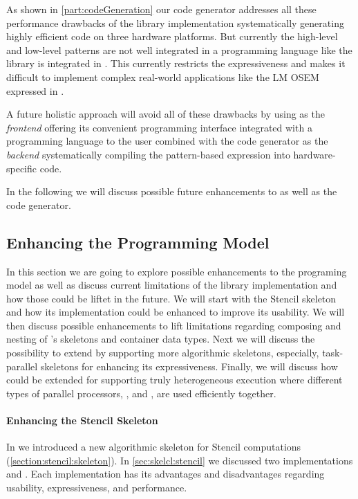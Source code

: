 As shown in \autoref{part:codeGeneration} our code generator addresses all these performance drawbacks of the \SkelCL library implementation systematically generating highly efficient code on three hardware platforms.
But currently the high-level and low-level patterns are not well integrated in a programming language like the \SkelCL library is integrated in \Cpp.
This currently restricts the expressiveness and makes it difficult to implement complex real-world applications like the LM OSEM expressed in \SkelCL.

A future holistic approach will avoid all of these drawbacks by using \SkelCL as the \emph{frontend} offering its convenient programming interface integrated with a programming language to the user combined with the code generator as the \emph{backend} systematically compiling the pattern-based expression into hardware-specific code.

\bigskip
In the following we will discuss possible future enhancements to \SkelCL as well as the code generator.

\subsection{Enhancing the \SkelCL Programming Model}
\label{section:future-work:skelcl}

In this section we are going to explore possible enhancements to the \SkelCL programing model as well as discuss current limitations of the \Cpp library implementation and how those could be liftet in the future.
We will start with the Stencil skeleton and how its implementation could be enhanced to improve its usability.
We will then discuss possible enhancements to lift limitations regarding composing and nesting of \SkelCL's skeletons and container data types.
Next we will discuss the possibility to extend \SkelCL by supporting more algorithmic skeletons, especially, task-parallel skeletons for enhancing its expressiveness.
Finally, we will discuss how \SkelCL could be extended for supporting truly heterogeneous execution where different types of parallel processors, \eg, \CPU and \GPU, are used efficiently together.

\paragraph{Enhancing the Stencil Skeleton}
In \SkelCL we introduced a new algorithmic skeleton for Stencil computations (\autoref{section:stencil:skeleton}).
In \autoref{sec:skelcl:stencil} we discussed two implementations  and .
Each implementation has its advantages and disadvantages regarding usability, expressiveness, and performance.

